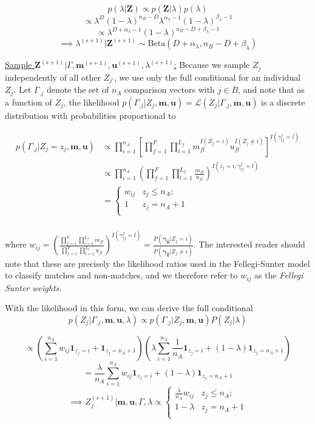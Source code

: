 \documentclass[12pt,letterpaper]{article}
\newcommand{\1}[1]{\mathbb{I}\!\left[#1\right]} %
\begin{document}
\[p(\lambda | \mathbf{Z}) \propto p(\mathbf{Z}|\lambda)p(\lambda)\]
\[\propto \lambda^D (1-\lambda)^{n_B - D} \lambda^{\alpha_{\lambda} -1} (1-\lambda)^{\beta_{\lambda} -1}\]
\[ \propto \lambda^{D + \alpha_{\lambda} - 1} (1-\lambda)^{n_B - D + \beta_{\lambda} -1}\]
\[\implies \lambda^{(s+1)}|\mathbf{Z}^{(s+1)} \sim \text{Beta}(D + \alpha_{\lambda}, n_B - D + \beta_{\lambda})\]

\underline{Sample $\mathbf{Z}^{(s+1)}|\Gamma, \mathbf{m}^{(s+1)}, \mathbf{u}^{(s+1)}, \lambda^{(s+1)}$:}
Because we sample \(Z_j\) independently of all other \(Z_{j'}\), we use
only the full conditional for an individual \(Z_j\). Let \(\Gamma_{.j}\)
denote the set of \(n_A\) comparison vectors with \(j \in B\), and note
that as a function of \(Z_j\), the likelihood
\(p(\Gamma_{.j}|Z_j, \mathbf{m}, \mathbf{u}) = \mathcal{L}(Z_j|\Gamma_{.j}, \mathbf{m}, \mathbf{u})\)
is a discrete distribution with probabilities proportional to

\begin{align*}
	p(\Gamma_{.j}|Z_j = z_j, \mathbf{m}, \mathbf{u}) &\propto \prod_{i=1}^{n_A}\left[\prod_{f=1}^{F}\prod_{l=1}^{L_f} m_{fl}^{I(Z_j = i)}u_{fl}^{I(Z_j \neq i)}\right]^{I(\gamma_{ij}^f = l)}\\
	&\propto \prod_{i=1}^{n_A}\left(\prod_{f=1}^{F}\prod_{l=1}^{L_f} \frac{m_{fl}}{u_{fl}}\right)^{I(z_j = i, \gamma_{ij}^f = l)} \\
	&=
	\begin{cases} 
		w_{ij}  & z_j \leq n_A; \\
		1 &  z_j  = n_A + 1 \\
	\end{cases}\\
\end{align*}

where
\(w_{ij} = \left(\frac{\prod_{f=1}^{F}\prod_{l=1}^{L_f} m_{fl}}{\prod_{f=1}^{F}\prod_{l=1}^{L_f} u_{fl}}\right)^{I(\gamma_{ij}^f = l)} = \frac{P(\boldsymbol{\gamma_{ij}}|Z_j = i)}{P(\boldsymbol{\gamma_{ij}} |Z_j \neq i)}\).
The interested reader should note that these are precisely the
likelihood ratios used in the Fellegi-Sunter model to classify matches
and non-matches, and we therefore refer to \(w_{ij}\) as the
\emph{Fellegi Sunter weights}.

With the likelihood in this form, we can derive the full conditional
\[p(Z_j|\Gamma_{.j}, \mathbf{m} ,\mathbf{u}, \lambda) \propto p(\Gamma_{.j}| Z_j, \mathbf{m} ,\mathbf{u}) P(Z_j|\lambda)\]

\[\propto \left(\sum_{i=1}^{n_A}w_{ij}\mathbf{1}_{z_j = i} + \mathbf{1}_{z_j = n_A + 1}\right)\left(\lambda\sum_{i=1}^{n_A}\frac{1}{n_A}\mathbf{1}_{z_j = i} + (1-\lambda)\mathbf{1}_{z_j = n_A + 1}\right)\]
\[= \frac{\lambda}{n_A}\sum_{i=1}^{n_A}w_{ij}\mathbf{1}_{z_j = i} + (1-\lambda)\mathbf{1}_{z_j = n_A + 1} \]
\[ \implies Z_j^{(s+1)} | \mathbf{m}, \mathbf{u}, \Gamma, \lambda \propto
\begin{cases} 
	\frac{\lambda}{n_A}w_{ij}   & z_j \leq n_A; \\
	1-\lambda &  z_j  = n_A + 1 \\
\end{cases}\]
\end{document}
